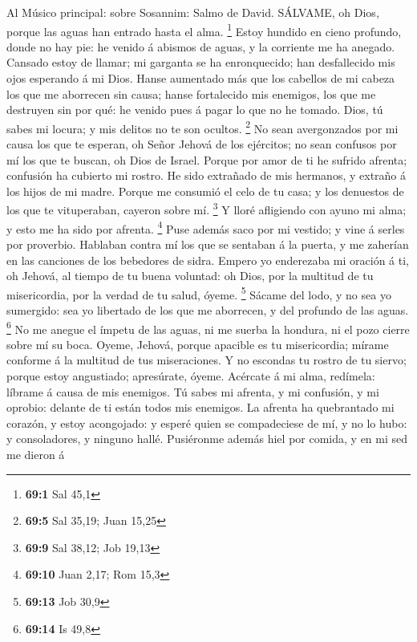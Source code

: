  Al Músico principal: sobre Sosannim: Salmo de David.
SÁLVAME, oh Dios, porque las aguas han entrado hasta el alma.
\footnote{\textbf{69:1} Sal 45,1}  Estoy hundido en cieno
profundo, donde no hay pie: he venido á abismos de aguas, y la corriente
me ha anegado.  Cansado estoy de llamar; mi garganta se ha
enronquecido; han desfallecido mis ojos esperando á mi Dios.
 Hanse aumentado más que los cabellos de mi cabeza los que
me aborrecen sin causa; hanse fortalecido mis enemigos, los que me
destruyen sin por qué: he venido pues á pagar lo que no he tomado.
 Dios, tú sabes mi locura; y mis delitos no te son ocultos.
\footnote{\textbf{69:5} Sal 35,19; Juan 15,25}  No sean
avergonzados por mi causa los que te esperan, oh Señor Jehová de los
ejércitos; no sean confusos por mí los que te buscan, oh Dios de Israel.
 Porque por amor de ti he sufrido afrenta; confusión ha
cubierto mi rostro.  He sido extrañado de mis hermanos, y
extraño á los hijos de mi madre.  Porque me consumió el celo
de tu casa; y los denuestos de los que te vituperaban, cayeron sobre mí.
\footnote{\textbf{69:9} Sal 38,12; Job 19,13}  Y lloré
afligiendo con ayuno mi alma; y esto me ha sido por afrenta. \footnote{\textbf{69:10}
  Juan 2,17; Rom 15,3}  Puse además saco por mi vestido; y
vine á serles por proverbio.  Hablaban contra mí los que se
sentaban á la puerta, y me zaherían en las canciones de los bebedores de
sidra.  Empero yo enderezaba mi oración á ti, oh Jehová, al
tiempo de tu buena voluntad: oh Dios, por la multitud de tu
misericordia, por la verdad de tu salud, óyeme. \footnote{\textbf{69:13}
  Job 30,9}  Sácame del lodo, y no sea yo sumergido: sea yo
libertado de los que me aborrecen, y del profundo de las aguas.
\footnote{\textbf{69:14} Is 49,8}  No me anegue el ímpetu
de las aguas, ni me suerba la hondura, ni el pozo cierre sobre mí su
boca.  Oyeme, Jehová, porque apacible es tu misericordia;
mírame conforme á la multitud de tus miseraciones.  Y no
escondas tu rostro de tu siervo; porque estoy angustiado; apresúrate,
óyeme.  Acércate á mi alma, redímela: líbrame á causa de
mis enemigos.  Tú sabes mi afrenta, y mi confusión, y mi
oprobio: delante de ti están todos mis enemigos.  La
afrenta ha quebrantado mi corazón, y estoy acongojado: y esperé quien se
compadeciese de mí, y no lo hubo: y consoladores, y ninguno hallé.
 Pusiéronme además hiel por comida, y en mi sed me dieron á
